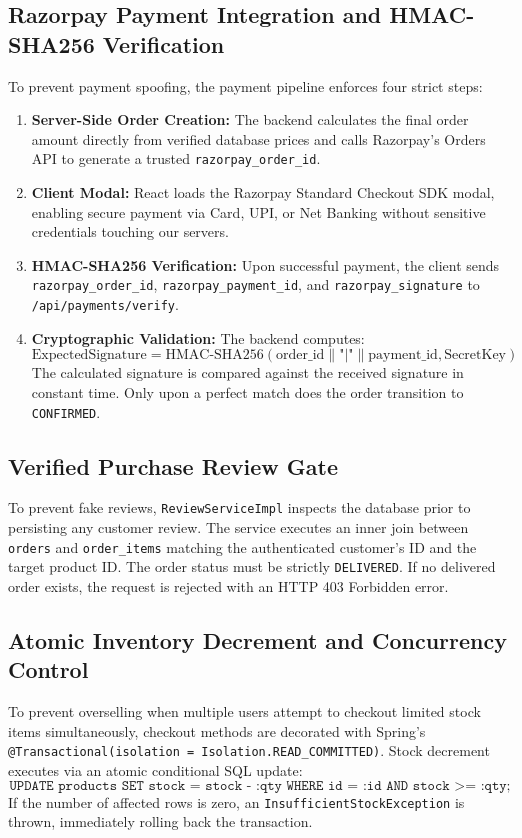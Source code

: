 \subsection{Razorpay Payment Integration and HMAC-SHA256 Verification}
To prevent payment spoofing, the payment pipeline enforces four strict steps:
\begin{enumerate}[leftmargin=2.0em]
    \item \textbf{Server-Side Order Creation:} The backend calculates the final order amount directly from verified database prices and calls Razorpay's Orders API to generate a trusted \texttt{razorpay\_order\_id}.
    \item \textbf{Client Modal:} React loads the Razorpay Standard Checkout SDK modal, enabling secure payment via Card, UPI, or Net Banking without sensitive credentials touching our servers.
    \item \textbf{HMAC-SHA256 Verification:} Upon successful payment, the client sends \texttt{razorpay\_order\_id}, \texttt{razorpay\_payment\_id}, and \texttt{razorpay\_signature} to \texttt{/api/payments/verify}.
    \item \textbf{Cryptographic Validation:} The backend computes:
    \begin{equation}
    \text{ExpectedSignature} = \text{HMAC-SHA256}(\text{order\_id} \parallel \text{"|"} \parallel \text{payment\_id}, \text{SecretKey})
    \end{equation}
    The calculated signature is compared against the received signature in constant time. Only upon a perfect match does the order transition to \texttt{CONFIRMED}.
\end{enumerate}

\subsection{Verified Purchase Review Gate}
To prevent fake reviews, \texttt{ReviewServiceImpl} inspects the database prior to persisting any customer review. The service executes an inner join between \texttt{orders} and \texttt{order\_items} matching the authenticated customer's ID and the target product ID. The order status must be strictly \texttt{DELIVERED}. If no delivered order exists, the request is rejected with an HTTP 403 Forbidden error.

\subsection{Atomic Inventory Decrement and Concurrency Control}
To prevent overselling when multiple users attempt to checkout limited stock items simultaneously, checkout methods are decorated with Spring's \texttt{@Transactional(isolation = Isolation.READ\_COMMITTED)}. Stock decrement executes via an atomic conditional SQL update:
\begin{equation}
\texttt{UPDATE products SET stock = stock - :qty WHERE id = :id AND stock >= :qty;}
\end{equation}
If the number of affected rows is zero, an \texttt{InsufficientStockException} is thrown, immediately rolling back the transaction.

